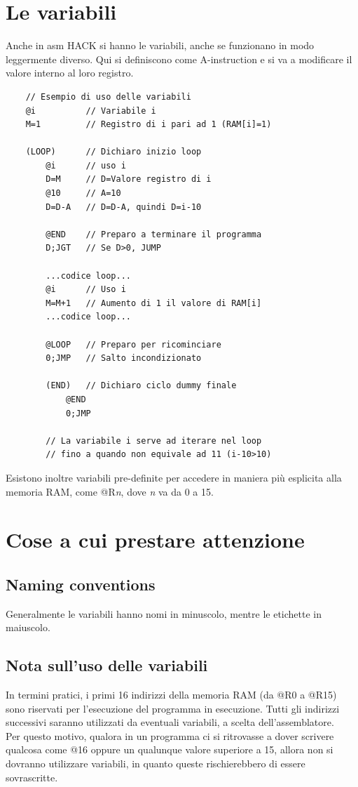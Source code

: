 \documentclass[12pt]{article}
\begin{document}
\section{Le variabili}
\label{sec:variables}
Anche in asm HACK si hanno le variabili, anche se funzionano in modo leggermente diverso.
Qui si definiscono come A-instruction e si va a modificare il valore interno al loro registro.
\begin{lstlisting}
    // Esempio di uso delle variabili
    @i          // Variabile i
    M=1         // Registro di i pari ad 1 (RAM[i]=1)

    (LOOP)      // Dichiaro inizio loop
        @i      // uso i
        D=M     // D=Valore registro di i
        @10     // A=10
        D=D-A   // D=D-A, quindi D=i-10

        @END    // Preparo a terminare il programma
        D;JGT   // Se D>0, JUMP

        ...codice loop...
        @i      // Uso i
        M=M+1   // Aumento di 1 il valore di RAM[i]
        ...codice loop...

        @LOOP   // Preparo per ricominciare
        0;JMP   // Salto incondizionato
    
        (END)   // Dichiaro ciclo dummy finale
            @END
            0;JMP
        
        // La variabile i serve ad iterare nel loop
        // fino a quando non equivale ad 11 (i-10>10)
\end{lstlisting}
Esistono inoltre variabili pre-definite per accedere in maniera più esplicita alla memoria RAM, come @R\textit{n}, dove \textit{n} va da 0 a 15. 
\pagebreak
\section{Cose a cui prestare attenzione}
\label{sec:nb_2}

\subsection{Naming conventions}
\label{ssec:nb_naming_conventions}
Generalmente le variabili hanno nomi in minuscolo, mentre le etichette in maiuscolo.

\subsection{Nota sull'uso delle variabili}
\label{ssec:nb_using_variables}
In termini pratici, i primi 16 indirizzi della memoria RAM (da @R0 a @R15) sono riservati per l'esecuzione del programma in esecuzione.
Tutti gli indirizzi successivi saranno utilizzati da eventuali variabili, a scelta dell'assemblatore. \\
Per questo motivo, qualora in un programma ci si ritrovasse a dover scrivere qualcosa come @16 oppure un qualunque valore superiore a 15, allora non si dovranno utilizzare variabili, in quanto queste rischierebbero di essere sovrascritte.
\end{document}
